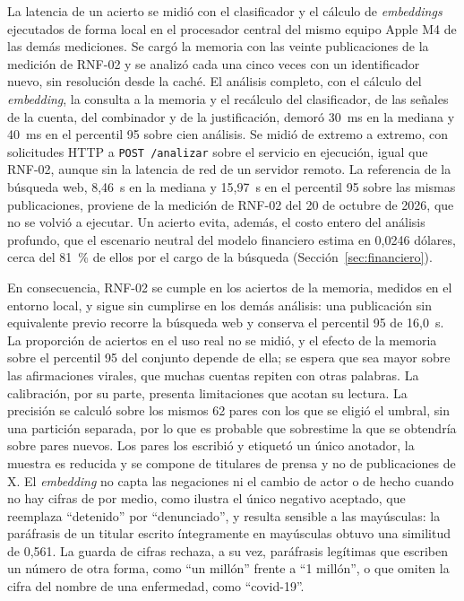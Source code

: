 La latencia de un acierto se midió con el clasificador y el cálculo de \textit{embeddings} ejecutados de forma local en el procesador central del mismo equipo Apple M4 de las demás mediciones. Se cargó la memoria con las veinte publicaciones de la medición de RNF-02 y se analizó cada una cinco veces con un identificador nuevo, sin resolución desde la caché. El análisis completo, con el cálculo del \textit{embedding}, la consulta a la memoria y el recálculo del clasificador, de las señales de la cuenta, del combinador y de la justificación, demoró 30~ms en la mediana y 40~ms en el percentil 95 sobre cien análisis. Se midió de extremo a extremo, con solicitudes HTTP a \texttt{POST /analizar} sobre el servicio en ejecución, igual que RNF-02, aunque sin la latencia de red de un servidor remoto. La referencia de la búsqueda web, 8,46~s en la mediana y 15,97~s en el percentil 95 sobre las mismas publicaciones, proviene de la medición de RNF-02 del 20 de octubre de 2026, que no se volvió a ejecutar. Un acierto evita, además, el costo entero del análisis profundo, que el escenario neutral del modelo financiero estima en 0,0246 dólares, cerca del 81~\% de ellos por el cargo de la búsqueda (Sección~\ref{sec:financiero}).

En consecuencia, RNF-02 se cumple en los aciertos de la memoria, medidos en el entorno local, y sigue sin cumplirse en los demás análisis: una publicación sin equivalente previo recorre la búsqueda web y conserva el percentil 95 de 16,0~s. La proporción de aciertos en el uso real no se midió, y el efecto de la memoria sobre el percentil 95 del conjunto depende de ella; se espera que sea mayor sobre las afirmaciones virales, que muchas cuentas repiten con otras palabras. La calibración, por su parte, presenta limitaciones que acotan su lectura. La precisión se calculó sobre los mismos 62 pares con los que se eligió el umbral, sin una partición separada, por lo que es probable que sobrestime la que se obtendría sobre pares nuevos. Los pares los escribió y etiquetó un único anotador, la muestra es reducida y se compone de titulares de prensa y no de publicaciones de X. El \textit{embedding} no capta las negaciones ni el cambio de actor o de hecho cuando no hay cifras de por medio, como ilustra el único negativo aceptado, que reemplaza \enquote{detenido} por \enquote{denunciado}, y resulta sensible a las mayúsculas: la paráfrasis de un titular escrito íntegramente en mayúsculas obtuvo una similitud de 0,561. La guarda de cifras rechaza, a su vez, paráfrasis legítimas que escriben un número de otra forma, como \enquote{un millón} frente a \enquote{1 millón}, o que omiten la cifra del nombre de una enfermedad, como \enquote{covid-19}.

